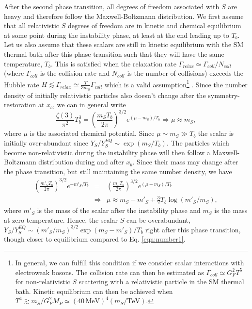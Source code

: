 After the second phase transition, all degrees of freedom associated with $S$ are heavy and therefore follow the Maxwell-Boltzmann distribution. We first assume that all relativistic $S$ degrees of freedom are in kinetic and chemical equilibrium at some point during the instability phase, at least at the end leading up to $T_b$. Let us also assume that these scalars are still in kinetic equilibrium with the SM thermal bath after this phase transition such that they will have the same temperature, $T_b$. This is satisfied when the relaxation rate $\Gamma_{relax} \simeq \Gamma_{coll}/N_{coll}$ (where $\Gamma_{coll}$ is the collision rate and $N_{coll}$ is the number of collisions) exceeds the Hubble rate $H \lesssim \Gamma_{relax} \simeq \frac{T}{3m_S} \Gamma_{coll}$ which is a valid assumption\footnote{In general, we can fulfill this condition if we consider scalar interactions with electroweak bosons. The collision rate can then be estimated as $\Gamma_{coll} \simeq G^2_F T^5$ for non-relativistic $S$ scattering with a relativistic particle in the SM thermal bath. Kinetic equilibrium can then be achieved when $T^4 \gtrsim m_S/G^2_F M_P \simeq (40\,\text{MeV})^4(m_S/\text{TeV})$.} \cite{RN806,RN807}. Since the number density of initially relativistic particles also doesn't change after the symmetry-restoration at $x_b$, we can in general write
\begin{equation}
	\frac{\zeta(3)}{\pi^2}T^3_b = \left( \frac{m_S T_b}{2\pi}\right)^{3/2} e^{(\mu-m_S)/T_b} \Rightarrow \mu \approx m_S,
	\label{eqn:number1}
\end{equation}
where $\mu$ is the associated chemical potential. Since $\mu \sim m_S \gg T_b$ the scalar is initially over-abundant since $Y_S/Y^{EQ}_S \sim \exp(m_S/T_b)$. The particles which become non-relativistic during the instability phase will then follow a Maxwell-Boltzmann distribution during and after $x_b$. Since their mass may change after the phase transition, but still maintaining the same number density, we have
\begin{eqnarray}
	\left( \frac{m'_S T_b}{2\pi}\right)^{3/2} e^{-m'_S / T_b} &=& \left( \frac{m_S T_b}{2\pi}\right)^{3/2} e^{(\mu-m_S)/ T_b} \nonumber \\ &\Rightarrow& \mu \approx m_S - m'_S + \frac{3}{2} T_b \log (m'_S/m_S),
\end{eqnarray}
where $m'_S$ is the mass of the scalar after the instability phase and $m_S$ is the mass at zero temperature. Hence, the scalar $S$ can be overabundant, $Y_S/Y^{EQ}_S \sim (m'_S/m_S)^{3/2} \exp (m_S-m'_S)/T_b$ right after this phase transition, though closer to equilibrium compared to Eq. \ref{eqn:number1}.

